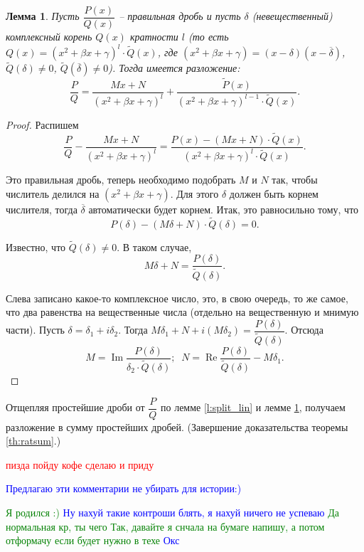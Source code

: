 \documentclass{article}
\theoremstyle{plain}
\newtheorem{lemma}{Лемма}
\theoremstyle{definition}
\theoremstyle{remark}
\renewcommand{\Re}{\operatorname{Re}}
\renewcommand{\Im}{\operatorname{Im}}
\begin{document}
\begin{lemma}\label{l:split_square}
Пусть $\dfrac{P(x)}{Q(x)}$ -- правильная дробь и пусть $\delta$ (невещественный) комплексный корень $Q(x)$ кратности $l$ (то есть $Q(x) = (x^2+ \beta x + \gamma)^{l}\cdot \widetilde{Q}(x)$, где $(x^2+ \beta x + \gamma)=(x-\delta)(x-\overline{\delta})$, $\widetilde{Q}(\delta) \neq 0 $,  $\widetilde{Q}(\overline{\delta}) \neq 0$). 
Тогда имеется разложение:
$$\frac{P}{Q} = \frac{Mx + N}{(x^2 + \beta x + \gamma)^l} + \frac{\widetilde{P}(x)}{(x^2 + \beta x + \gamma)^{l-1}\cdot \widetilde{Q}(x)}.$$
\end{lemma}

\begin{proof}
Распишем $$\dfrac{P}{Q} - \frac{Mx + N}{(x^2 + \beta x + \gamma)^l} = \frac{P(x)-(Mx + N)\cdot \widetilde{Q}(x)}{(x^2 + \beta x + \gamma)^l \cdot \widetilde{Q}(x)}.$$ 

Это правильная дробь, теперь необходимо подобрать $M$ и $N$ так, чтобы числитель делился на $(x^2 + \beta x + \gamma).$ Для этого $\delta$ должен быть корнем числителя, тогда $\overline{\delta}$ автоматически будет корнем. Итак, это равносильно тому, что \[P(\delta) - (M\delta + N) \cdot \widetilde{Q}(\delta) = 0.\] 

Известно, что $\widetilde{Q}(\delta) \neq 0.$ В таком случае, \[M\delta + N = \frac{P(\delta)}{\widetilde{Q}(\delta)}.\]

Слева записано какое-то комплексное число, это, в свою очередь, то же самое, что два равенства на вещественные числа (отдельно на вещественную и мнимую части). Пусть $\delta = \delta_1 + i\delta_2.$ Тогда $M\delta_1 + N + i(M\delta_2) = \dfrac{P(\delta)}{\widetilde{Q}(\delta)}.$ Отсюда \[M = \Im\frac{P(\delta)}{\delta_2\cdot \widetilde{Q}(\delta)};\;\; N = \Re\frac{P(\delta)}{\widetilde{Q}(\delta)} - M\delta_1.\] 
\end{proof}

Отщепляя простейшие дроби от $\dfrac{P}{Q}$ по лемме \ref{l:split_lin} и лемме \ref{l:split_square}, получаем разложение в сумму простейших дробей. (Завершение доказательства теоремы \ref{th:ratsum}.)

\textcolor{red}{пизда
пойду кофе сделаю и приду}

\textcolor{blue}{Предлагаю эти комментарии не убирать для истории:)}

\textcolor{green}{Я родился :)}
\textcolor{blue}{Ну нахуй такие контроши блять, я нахуй ничего не успеваю}
\textcolor{green}{Да нормальная кр, ты чего}
\textcolor{green}{Так, давайте я снчала на бумаге напишу, а потом отформачу если будет нужно в техе}
\textcolor{blue}{Окс}
\end{document}
